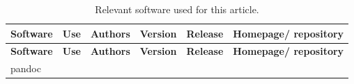 \documentclass[10pt,fleqn]{wlpeerj}
\begin{document}
\begin{longtable}[c]{@{}llllll@{}}
\caption{Relevant software used for this article.}\tabularnewline
\toprule
\begin{minipage}[b]{0.08\columnwidth}\raggedright\strut
\textbf{Software}
\strut\end{minipage} &
\begin{minipage}[b]{0.20\columnwidth}\raggedright\strut
\textbf{Use}
\strut\end{minipage} &
\begin{minipage}[b]{0.17\columnwidth}\raggedright\strut
\textbf{Authors}
\strut\end{minipage} &
\begin{minipage}[b]{0.06\columnwidth}\raggedright\strut
\textbf{Version}
\strut\end{minipage} &
\begin{minipage}[b]{0.06\columnwidth}\raggedright\strut
\textbf{Release}
\strut\end{minipage} &
\begin{minipage}[b]{0.25\columnwidth}\raggedright\strut
\textbf{Homepage/ repository}
\strut\end{minipage}\tabularnewline
\midrule
\endfirsthead
\toprule
\begin{minipage}[b]{0.08\columnwidth}\raggedright\strut
\textbf{Software}
\strut\end{minipage} &
\begin{minipage}[b]{0.20\columnwidth}\raggedright\strut
\textbf{Use}
\strut\end{minipage} &
\begin{minipage}[b]{0.17\columnwidth}\raggedright\strut
\textbf{Authors}
\strut\end{minipage} &
\begin{minipage}[b]{0.06\columnwidth}\raggedright\strut
\textbf{Version}
\strut\end{minipage} &
\begin{minipage}[b]{0.06\columnwidth}\raggedright\strut
\textbf{Release}
\strut\end{minipage} &
\begin{minipage}[b]{0.25\columnwidth}\raggedright\strut
\textbf{Homepage/ repository}
\strut\end{minipage}\tabularnewline
\midrule
\endhead
\begin{minipage}[t]{0.08\columnwidth}\raggedright\strut
pandoc
\strut\end{minipage} &
\begin{minipage}[t]{0.20\columnwidth}\raggedright\strut

\end{minipage}
\end{longtable}
\end{document}

